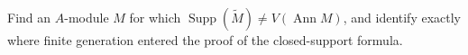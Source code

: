 \begin{problem}
Find an $A$-module $M$ for which $\operatorname{Supp}(\widetilde M)\neq V(\operatorname{Ann}M)$, and identify exactly where finite generation entered the proof of the closed-support formula.
\end{problem}
